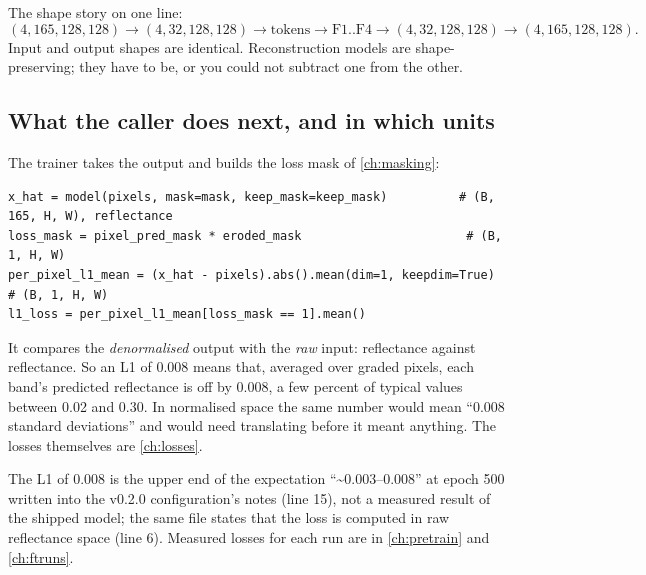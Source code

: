 
The shape story on one line:
\[
(4, 165, 128, 128) \to (4, 32, 128, 128) \to \text{tokens} \to \text{F1..F4} \to (4, 32, 128, 128) \to (4, 165, 128, 128).
\]
Input and output shapes are identical. Reconstruction models are shape-preserving; they have to be,
or you could not subtract one from the other.

\subsection{What the caller does next, and in which units}

The trainer takes the output and builds the loss mask of \cref{ch:masking}:
\begin{lstlisting}
x_hat = model(pixels, mask=mask, keep_mask=keep_mask)          # (B, 165, H, W), reflectance
loss_mask = pixel_pred_mask * eroded_mask                       # (B, 1, H, W)
per_pixel_l1_mean = (x_hat - pixels).abs().mean(dim=1, keepdim=True)   # (B, 1, H, W)
l1_loss = per_pixel_l1_mean[loss_mask == 1].mean()
\end{lstlisting}
It compares the \emph{denormalised} output with the \emph{raw} input: reflectance against reflectance.
So an L1 of 0.008 means that, averaged over graded pixels, each band's predicted reflectance is off by
0.008, a few percent of typical values between 0.02 and 0.30. In normalised space the same number would
mean ``0.008 standard deviations'' and would need translating before it meant anything. The losses
themselves are \cref{ch:losses}.

\begin{drift}
The L1 of 0.008 is the upper end of the expectation ``\textasciitilde 0.003--0.008'' at epoch 500 written into the
v0.2.0 configuration's notes (line 15), not a measured
result of the shipped model; the same file states that the loss is computed in raw reflectance space
(line 6). Measured losses for each run are in \cref{ch:pretrain} and \cref{ch:ftruns}.
\end{drift}

